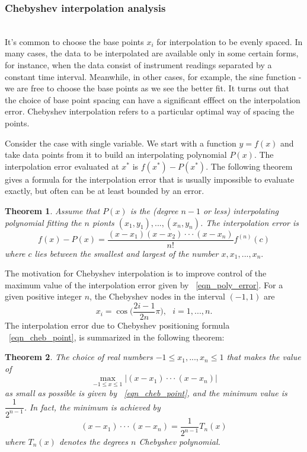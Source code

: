 \documentclass[11pt,reqno]{amsart}
\newtheorem{theorem}{Theorem}%
\theoremstyle{definition}
\begin{document}
\subsubsection{Chebyshev interpolation analysis}~\\
It's common to choose the base points $x_i$ for interpolation to be evenly spaced. In many cases, the data to be interpolated are available only in some certain forms, for instance, when the data consist of instrument readings separated by a constant time interval. Meanwhile, in other cases, for example, the sine function - we are free to choose the base points as we see the better fit. It turns out that the choice of base point spacing can have a significant efffect on the interpolation error. Chebyshev interpolation refers to a particular optimal way of spacing the points.

Consider the case with single variable. We start with a function $y=f(x)$ and take data points from it to build an interpolating polynomial $P(x)$. The interpolation error evaluated at $x^*$ is $f(x^*)-P(x^*)$. The following theorem gives a formula for the interpolation error that is usually impossible to evaluate exactly, but often can be at least bounded by an error.
\begin{theorem}
Assume that $P(x)$ is the (degree $n-1$ or less) interpolating polynomial fitting the $n$ pionts $(x_1,y_1),...,(x_n,y_n)$. The interpolation error is 
\begin{equation} \label{eqn_poly_error}
f(x)-P(x)=\frac{(x-x_1)(x-x_2)\cdot\cdot\cdot(x-x_n)}{n!}f^{(n)}(c)
\end{equation}
where $c$ lies between the smallest and largest of the number $x,x_1,...,x_n.$
\end{theorem}
The motivation for Chebyshev interpolation is to improve control of the maximum value of the interpolation error given by ~\eqref{eqn_poly_error}. For a given positive integer $n$, the Chebyshev nodes in the interval $(-1,1)$ are
\begin{equation}
\label{eqn_cheb_point}
x_i=\cos\Big(\frac{2i-1}{2n}\pi\Big),\mbox{ }i=1,...,n.
\end{equation}
The interpolation error due to Chebyshev positioning formula ~\eqref{eqn_cheb_point}, is summarized in the following theorem:
\begin{theorem}
The choice of real numbers $-1\le x_1,...,x_n\le 1$ that makes the value of 
\begin{equation}
\max_{-1 \leq x \leq 1}|(x-x_1)\cdot\cdot\cdot(x-x_n)|
\end{equation}
as small as possible is given by ~\eqref{eqn_cheb_point}, and the minimum value is $\dfrac{1}{2^{n-1}}$. In fact, the minimum is achieved by 
\begin{equation} \label{eqn_cheb_error}
(x-x_1)\cdot\cdot\cdot(x-x_n)=\frac{1}{2^{n-1}}T_n(x)
\end{equation}
where $T_n(x)$ denotes the degrees $n$ Chebyshev polynomial.
\end{theorem}
\end{document}
